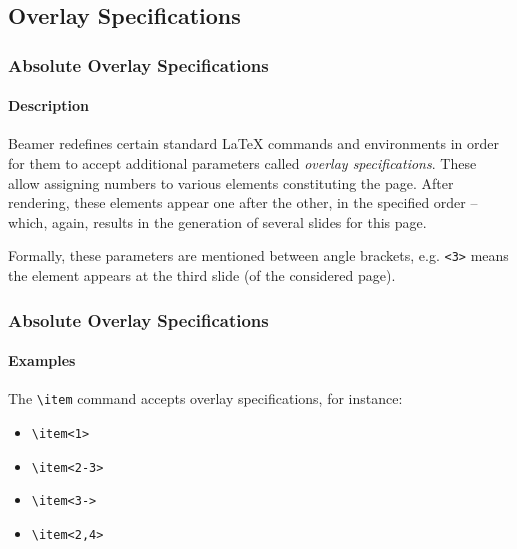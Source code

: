\documentclass[10pt,    %
    english,            %
    xcolor=table,       %
    envcountsect,       %
    aspectratio=43      %
]{beamer}
\begin{document}
\subsection{Overlay Specifications}
\begin{frame}
    \frametitle{Absolute Overlay Specifications}
    \framesubtitle{Description}
    
    Beamer redefines certain standard \LaTeX{} commands and environments in order for them to accept additional parameters called \textit{overlay specifications}. These allow assigning numbers to various elements constituting the page. After rendering, these elements appear one after the other, in the specified order --which, again, results in the generation of several slides for this page.
    
    \vspace{0.25cm}
    Formally, these parameters are mentioned between angle brackets, e.g. \texttt{<3>} means the element appears at the third slide (of the considered page).   
\end{frame}

\begin{frame}
    \frametitle{Absolute Overlay Specifications}
    \framesubtitle{Examples}
    
    The \texttt{\textbackslash{}item} command accepts overlay specifications, for instance:
    \begin{itemize}
       \item<1> \texttt{\textbackslash{}item<1>}
       \item<2-3> \texttt{\textbackslash{}item<2-3>}
       \item<3-> \texttt{\textbackslash{}item<3->}
       \item<2,4> \texttt{\textbackslash{}item<2,4>}
    \end{itemize}
    
    \vspace{0.25cm}
    
    \vspace{0.25cm}
\end{frame}
\end{document}
